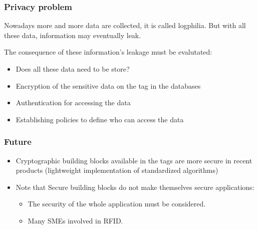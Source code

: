 \subsubsection{Privacy problem}

Nowadays more and more data are collected, it is called
logphilia. But with all these data, information may eventually leak.

The consequence of these information's leakage must be evalutated:
\begin{itemize}
    \item Does all these data need to be store?
    \item Encryption of the sensitive data on the tag in the databases
    \item Authentication for accessing the data
    \item Establishing policies to define who can access the data
\end{itemize}

\subsubsection{Future}
\begin{itemize}
    \item Cryptographic building blocks available in the tags are more
        secure in recent products (lightweight implementation of
        standardized algorithms)
    \item Note that Secure building blocks do not make themselves secure
        applications: 
        \begin{itemize}
            \item The security of the whole application must be considered.
            \item Many SMEs involved in RFID.
        \end{itemize}
\end{itemize}

